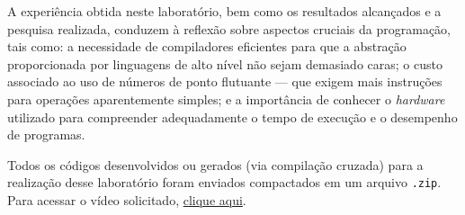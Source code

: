 \documentclass[a4paper,12pt]{article}
\newcommand{\cod}[1]{\texttt{#1}}
\begin{document}
A experiência obtida neste laboratório, bem como os resultados alcançados e a pesquisa realizada, conduzem à reflexão sobre aspectos cruciais da programação, tais como: a necessidade de compiladores eficientes para que a abstração proporcionada por linguagens de alto nível não sejam demasiado caras; o custo associado ao uso de números de ponto flutuante — que exigem mais instruções para operações aparentemente simples; e a importância de conhecer o \textit{hardware} utilizado para compreender adequadamente o tempo de execução e o desempenho de programas.

Todos os códigos desenvolvidos ou gerados (via compilação cruzada) para a realização desse laboratório foram enviados compactados em um arquivo \cod{.zip}. Para acessar o vídeo solicitado, \href{https://www.youtube.com/watch?v=xyz123}{clique aqui}.
\end{document}
